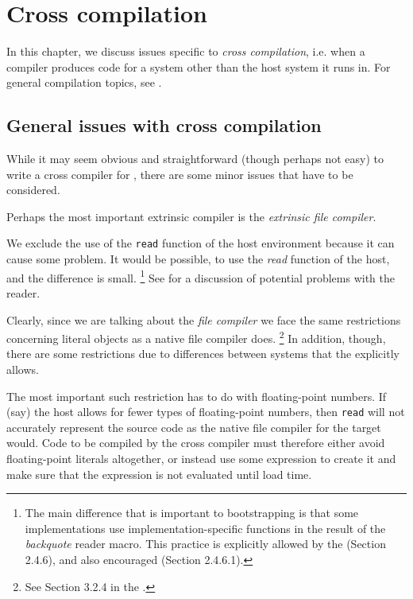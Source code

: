 \chapter{Cross compilation}
\label{chap-cross-compilation}

In this chapter, we discuss issues specific to \emph{cross
  compilation}, i.e. when a compiler produces code for a system other
than the host \commonlisp{} system it runs in.  For general compilation
topics, see .

\section{General issues with cross compilation}

While it may seem obvious and straightforward (though perhaps not
easy) to write a cross compiler for \commonlisp{}, there are some minor issues
that have to be considered. 

Perhaps the most important extrinsic compiler is the \emph{extrinsic
  file compiler}.

We exclude the use of the \texttt{read} function of the host
environment because it can cause some problem.  It would be possible,
to use the \emph{read} function of the host, and the difference is
small.%
\footnote{The main difference that is important to bootstrapping is
  that some implementations use implementation-specific functions in
  the result of the \emph{backquote} reader macro.  This practice is
  explicitly allowed by the \hs{} (Section 2.4.6), and also encouraged
  (Section 2.4.6.1).}
See  for a discussion of
potential problems with the reader.

Clearly, since we are talking about the \emph{file compiler} we face
the same restrictions concerning literal objects as a native file
compiler does.%
\footnote{See Section 3.2.4 in the \hs{}.} %
In addition, though, there are some restrictions due to differences
between systems that the \hs{} explicitly allows.  

The most important such restriction has to do with floating-point
numbers.  If (say) the host allows for fewer types of floating-point
numbers, then \texttt{read} will not accurately represent the source
code as the native file compiler for the target would.  Code to be
compiled by the cross compiler must therefore either avoid
floating-point literals altogether, or instead use some expression to
create it and make sure that the expression is not evaluated until
load time.  

